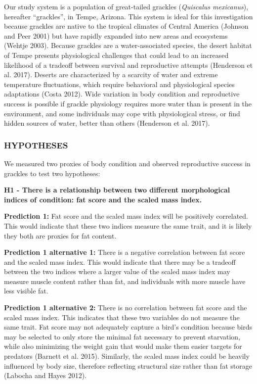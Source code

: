 \documentclass[
]{article}
\begin{document}
Our study system is a population of great-tailed grackles
(\emph{Quiscalus mexicanus}), hereafter ``grackles'', in Tempe, Arizona.
This system is ideal for this investigation because grackles are native
to the tropical climates of Central America (Johnson and Peer 2001) but
have rapidly expanded into new areas and ecosystems (Wehtje 2003).
Because grackles are a water-associated species, the desert habitat of
Tempe presents physiological challenges that could lead to an increased
likelihood of a tradeoff between survival and reproductive attempts
(Henderson et al. 2017). Deserts are characterized by a scarcity of
water and extreme temperature fluctuations, which require behavioral and
physiological species adaptations (Costa 2012). Wide variation in body
condition and reproductive success is possible if grackle physiology
requires more water than is present in the environment, and some
individuals may cope with physiological stress, or find hidden sources
of water, better than others (Henderson et al. 2017).

\hypertarget{hypotheses}{%
\subsubsection{HYPOTHESES}\label{hypotheses}}

We measured two proxies of body condition and observed reproductive
success in grackles to test two hypotheses:

\textbf{H1 - There is a relationship between two different morphological
indices of condition: fat score and the scaled mass index.}

\textbf{Prediction 1:} Fat score and the scaled mass index will be
positively correlated. This would indicate that these two indices
measure the same trait, and it is likely they both are proxies for fat
content.

\textbf{Prediction 1 alternative 1:} There is a negative correlation
between fat score and the scaled mass index. This would indicate that
there may be a tradeoff between the two indices where a larger value of
the scaled mass index may measure muscle content rather than fat, and
individuals with more muscle have less visible fat.

\textbf{Prediction 1 alternative 2:} There is no correlation between fat
score and the scaled mass index. This indicates that these two variables
do not measure the same trait. Fat score may not adequately capture a
bird's condition because birds may be selected to only store the minimal
fat necessary to prevent starvation, while also minimizing the weight
gain that would make them easier targets for predators (Barnett et al.
2015). Similarly, the scaled mass index could be heavily influenced by
body size, therefore reflecting structural size rather than fat storage
(Labocha and Hayes 2012).
\end{document}
